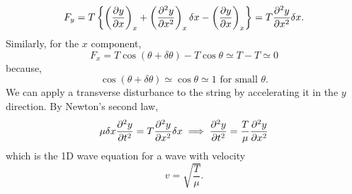 \documentclass{book}
\begin{document}
\begin{equation}
    F_y = T\left\{\left(\pdv{y}{x}\right)_x + \left(\pdv[2]{y}{x}\right)_x\delta x - \left(\pdv{y}{x}\right)_x\right\} = T\pdv[2]{y}{x}\delta x.
\end{equation}
Similarly, for the $x$ component,
\begin{equation}
    F_x = T\cos(\theta + \delta\theta) - T\cos\theta \simeq T - T \simeq 0
\end{equation}
because,
\begin{equation}
    \cos(\theta + \delta \theta) \simeq \cos\theta \simeq 1 \text{ for small } \theta.
\end{equation}
We can apply a transverse disturbance to the string by accelerating it in the $y$ direction. By Newton's second law,
\begin{equation}
    \mu \delta x \pdv[2]{y}{t} = T\pdv[2]{y}{x}\delta x \implies \pdv[2]{y}{t} = \frac{T}{\mu}\pdv[2]{y}{x}
\end{equation}
which is the 1D wave equation for a wave with velocity
\begin{equation}
    v = \sqrt{\dfrac{T}{\mu}}. \label{velocitystring}
\end{equation}
\end{document}
